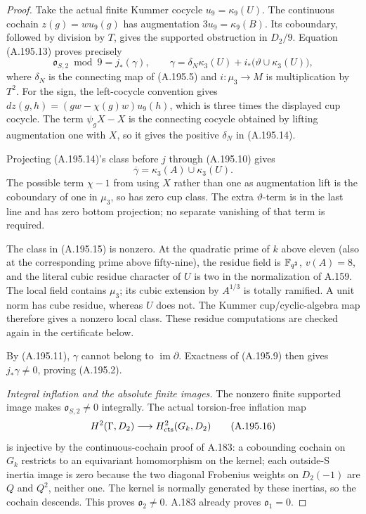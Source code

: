 \begin{proof}
Take the actual finite Kummer cocycle \(u_9=\kappa_9(U)\).
The continuous cochain \(z(g)=wu_9(g)\) has augmentation
\(3u_9=\kappa_9(B)\).  Its coboundary, followed by division
by \(T\), gives the supported obstruction in \(D_2/9\).
Equation (A.195.13) proves precisely
\[
 \mathfrak o_{S,2}\bmod9=j_*(\gamma),\qquad
 \gamma=\delta_N\kappa_3(U)
       +i_*\bigl(\vartheta\cup\kappa_3(U)\bigr),
\tag{A.195.14}
\]
where \(\delta_N\) is the connecting map of (A.195.5)
and \(i:\mu_3\to M\) is multiplication by \(T^2\).
For the sign, the left-cocycle convention gives
\(dz(g,h)=(g w-\chi(g)w)u_9(h)\), which is three
times the displayed cup cocycle.  The term
\(\psi_gX-X\) is the connecting cocycle obtained by
lifting augmentation one with \(X\), so it gives
the positive \(\delta_N\) in (A.195.14).

Projecting (A.195.14)'s class before \(j\) through
(A.195.10) gives
\[
          \overline\gamma
                 =\kappa_3(A)\cup\kappa_3(U).
\tag{A.195.15}
\]
The possible term \(\chi-1\) from using \(X\) rather
than one as augmentation lift is the coboundary of one
in \(\mu_3\), so has zero cup class.  The extra
\(\vartheta\)-term is in the last line and has zero
bottom projection; no separate vanishing of that term
is required.

The class in (A.195.15) is nonzero.  At the quadratic
prime of \(k\) above eleven (also at the corresponding
prime above fifty-nine), the residue field is \(\mathbb F_{q^2}\),
\(v(A)=8\), and the literal cubic residue character
of \(U\) is two in the normalization of A.159.
The local field contains \(\mu_3\); its cubic extension
by \(A^{1/3}\) is totally ramified.  A unit norm has
cube residue, whereas \(U\) does not.  The Kummer
cup/cyclic-algebra map therefore gives a nonzero local
class.  These residue computations are checked again
in the certificate below.

By (A.195.11), \(\gamma\) cannot belong to
\(\operatorname{im}\partial\).  Exactness of (A.195.9)
then gives \(j_*\gamma\ne0\), proving (A.195.2).

\emph{Integral inflation and the absolute finite images.}
The nonzero finite supported image makes
\(\mathfrak o_{S,2}\ne0\) integrally.  The actual
torsion-free inflation map
\[
 H^2(\Gamma,D_2)\longrightarrow H^2_{\rm cts}(G_k,D_2)
\tag{A.195.16}
\]
is injective by the continuous-cochain proof of A.183:
a cobounding cochain on \(G_k\) restricts to an equivariant
homomorphism on the kernel; each outside-S inertia image
is zero because the two diagonal Frobenius weights on
\(D_2(-1)\) are \(Q\) and \(Q^2\), neither one.
The kernel is normally generated by these inertias, so
the cochain descends.  This proves \(\mathfrak o_2\ne0\).
A.183 already proves \(\mathfrak o_1=0\).


\end{proof}
